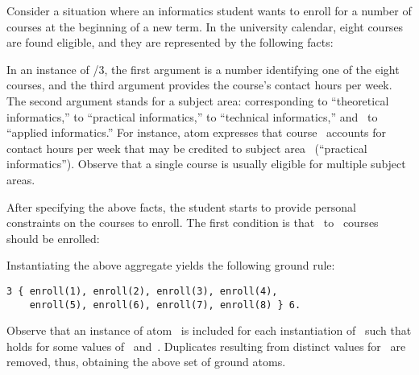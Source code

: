 \begin{example}\label{ex:aggr}
Consider a situation where an informatics student
wants to enroll for a number of courses at the beginning of a new term.
In the university calendar, eight courses are found eligible,
and they are represented by the following facts:
%

%
In an instance of /$3$,
the first argument is a number identifying one of the eight courses,
and the third argument provides the course's contact hours per week.
The second argument stands for a subject area:
 corresponding to ``theoretical informatics,''
               to ``practical informatics,''
               to ``technical informatics,''
and~               to ``applied informatics.''
For instance, atom 
expresses that course~ accounts for~ contact hours per week
that may be credited to subject area~ (``practical informatics'').
Observe that a single course is usually eligible for multiple
subject areas.

After specifying the above facts,
the student starts to provide personal constraints on the courses to enroll.
The first condition is that~ to~ courses should be enrolled:
%

%
Instantiating the above  aggregate
yields the following ground rule:%
%
\begin{lstlisting}[firstnumber=9,stepnumber=9]
3 { enroll(1), enroll(2), enroll(3), enroll(4), 
    enroll(5), enroll(6), enroll(7), enroll(8) } 6.
\end{lstlisting}
%
Observe that an instance of atom~ is included for each
instantiation of~ such that 
holds for some values of~ and~.
Duplicates resulting from distinct values for~ are removed, thus,
obtaining the above set of ground atoms.


\end{example}
